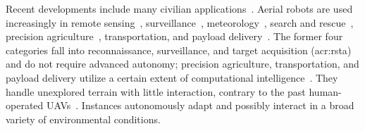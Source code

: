 Recent developments include many civilian applications~\citep{gonzalez2017unmanned}. Aerial robots are used increasingly in remote sensing~\citep{colomina2014unmanned,noor2018remote,tang2015drone,milas2018drones}, surveillance~\citep{acevedo2014one,ramasamy2017heuristic,basilico2015deploying,paucar2018use,burkle2009collaborating}, meteorology~\citep{renzaglia2016monitoring,schuyler2019using}, search and rescue~\citep{hayat2017multi,pensieri2020drones,karaca2018potential,cui2015drones,seguin2018unmanned}, precision agriculture~\citep{popovic2017online,sa2018weednet,lottes2017uav,daponte2019review,puri2017agriculture}, transportation, and payload delivery~\citep{kellermann2020drones}. The former four categories fall into reconnaissance, surveillance, and target acquisition (\Gls{acr:rsta}) and do not require advanced autonomy; precision agriculture, transportation, and payload delivery utilize a certain extent of computational intelligence~\citep{siciliano2016springer}. They handle unexplored terrain with little interaction, contrary to the past human-operated UAVs~\citep{siciliano2016springer}. Instances autonomously adapt and possibly interact in a broad variety of environmental conditions.

